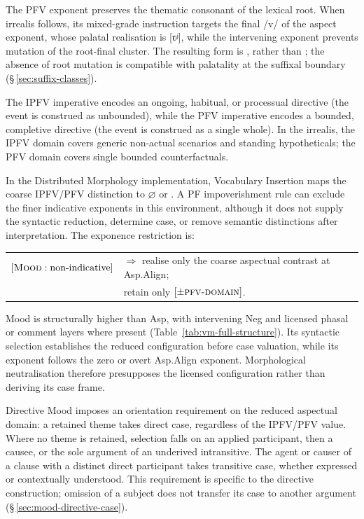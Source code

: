 The PFV exponent  preserves the thematic consonant of the lexical
root. When irrealis  follows, its mixed-grade instruction targets
the final /v/ of the aspect exponent, whose palatal realisation is [ʋʲ],
while the intervening exponent prevents mutation of the root-final cluster.
The resulting form is , rather than ;
the absence of root mutation is compatible with palatality at the suffixal
boundary (§\,\ref{sec:suffix-classes}).

The IPFV imperative encodes an ongoing,
habitual, or processual directive (the event is construed as
unbounded), while the PFV imperative encodes a bounded, completive
directive (the event is construed as a single whole). In the irrealis,
the IPFV domain covers generic non-actual scenarios and standing
hypotheticals; the PFV domain covers single bounded counterfactuals.

In the Distributed Morphology implementation, Vocabulary Insertion maps the
coarse IPFV/PFV distinction to $\varnothing$ or . A PF
impoverishment rule can exclude the finer indicative exponents in this
environment, although it does not supply the syntactic reduction, determine
case, or remove semantic distinctions after interpretation. The
exponence restriction is:

\medskip
\noindent\begin{tabular}{@{}l@{\quad}l}
$[\textsc{Mood}: \text{non-indicative}]$ & $\Rightarrow$ realise only the coarse
aspectual contrast at Asp.Align; \\
& \hspace*{1.5em}retain only $[\pm\textsc{pfv-domain}]$.
\end{tabular}
\medskip

Mood is structurally higher than Asp, with intervening Neg and licensed
phasal or comment layers where present
(Table~\ref{tab:vm-full-structure}). Its syntactic selection establishes the
reduced configuration before case valuation, while its exponent follows the
zero or overt Asp.Align exponent. Morphological neutralisation therefore
presupposes the licensed configuration rather than deriving its case frame.

Directive Mood imposes an orientation requirement on the reduced aspectual
domain: a retained theme takes direct case, regardless of the IPFV/PFV value.
Where no theme is retained, selection falls on an applied participant, then a
causee, or the sole argument of an underived intransitive. The agent or causer
of a clause with a distinct direct participant takes transitive case, whether
expressed or contextually understood. This requirement is specific to the
directive construction; omission of a subject does not transfer its case to
another argument (§\,\ref{sec:mood-directive-case}).


